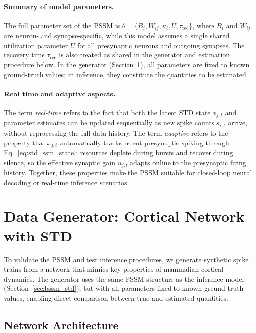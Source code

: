 \documentclass[11pt]{article}
\begin{document}
\paragraph{Summary of model parameters.}
The full parameter set of the PSSM is $\theta=\{B_i, W_{ij}, \kappa_\ell, U,
\tau_{\mathrm{rec}}\}$, where $B_i$ and $W_{ij}$ are neuron- and synapse-specific,
while this model assumes a single shared utilization parameter $U$ for all
presynaptic neurons and outgoing synapses. The recovery time
$\tau_{\mathrm{rec}}$ is also treated as shared in the generator and estimation
procedure below. In the generator
(Section~\ref{sec:generator}), all parameters are fixed to known ground-truth
values; in inference, they constitute the quantities to be estimated.

\paragraph{Real-time and adaptive aspects.}
The term \emph{real-time} refers to the fact that both the latent STD state
$x_{j,t}$ and parameter estimates can be updated sequentially as new spike
counts $s_{i,t}$ arrive, without reprocessing the full data history. The term
\emph{adaptive} refers to the property that $x_{j,t}$ automatically tracks recent
presynaptic spiking through Eq.~\eqref{eq:std_ssm_state}: resources deplete during
bursts and recover during silence, so the effective synaptic gain $u_{j,t}$ adapts
online to the presynaptic firing history. Together, these properties make the PSSM
suitable for closed-loop neural decoding or real-time inference scenarios.

\section{Data Generator:  Cortical Network with STD}
\label{sec:generator}

To validate the PSSM and test inference procedures, we generate synthetic spike
trains from a network that mimics key properties of mammalian cortical dynamics.
The generator uses the same PSSM structure as the inference model 
(Section~\ref{sec:bssm_std}), but with all parameters fixed to known ground-truth
values, enabling direct comparison between true and estimated quantities.

\subsection{Network Architecture}
\label{sec:gen_architecture}
\end{document}
